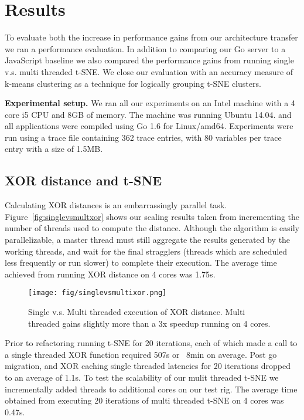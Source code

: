 \section{Results}
\label{sec:res}

To evaluate both the increase in performance gains from our
architecture transfer we ran a performance evaluation. In addition to
comparing our Go server to a JavaScript baseline we also compared the
performance gains from running single v.s. multi threaded t-SNE. We
close our evaluation with an accuracy measure of k-means clustering as
a technique for logically grouping t-SNE clusters.

\textbf{Experimental setup.} We ran all our experiments on an Intel
machine with a 4 core i5 CPU and 8GB of memory. The machine was
running Ubuntu 14.04. and all applications were compiled using Go 1.6
for Linux/amd64. Experiments were run using a trace file containing
362 trace entries, with 80 variables per trace entry with a size of
1.5MB.

\subsection{XOR distance and t-SNE}

Calculating XOR distances is an embarrassingly parallel task.
Figure~\ref{fig:singlevsmultxor} shows our scaling results taken from
incrementing the number of threads used to compute the distance.
Although the algorithm is easily parallelizable, a master thread must
still aggregate the results generated by the working threads, and wait
for the final stragglers (threads which are scheduled less frequently
or run slower) to complete their execution. The average time achieved
from running XOR distance on 4 cores was 1.75s.


\begin{figure}[t]
\centering
    \texttt{[image: fig/singlevsmultixor.png]}

    \caption{ Single v.s. Multi threaded execution of XOR distance.
    Multi threaded gains slightly more than a 3x speedup running on 4
    cores.}

    \label{fig:singlevsmultixor}
\end{figure}

Prior to refactoring running t-SNE for 20 iterations, each of which
made a call to a single threaded XOR function required 507s or ~8min
on average. Post go migration, and XOR caching single threaded
latencies for 20 iterations dropped to an average of 1.1s. To test
the scalability of our mulit threaded t-SNE we incrementally added
threads to additional cores on our test rig. The average time obtained
from executing 20 iterations of multi threaded t-SNE on 4 cores was
0.47s.

